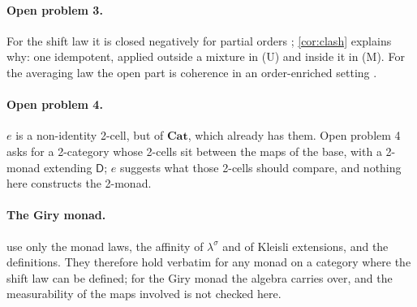 \documentclass[11pt]{article}
\theoremstyle{definition}
\newcommand{\D}{\mathsf D}
\newcommand{\ls}{\lambda^{\sigma}}
\begin{document}
\paragraph{Open problem 3.} For the shift law it is closed negatively for partial orders \cite[Prop.~13.17]{Tower}; \cref{cor:clash}
explains why: one idempotent, applied outside a mixture in (U) and inside it in (M). For the averaging law the open part is coherence
in an order-enriched setting \cite[Thm.~13.16]{Tower}.
\paragraph{Open problem 4.} $e$ is a non-identity 2-cell, but of $\mathbf{Cat}$, which already has them. Open problem 4 asks for a 2-category
whose 2-cells sit between the maps of the base, with a 2-monad extending $\D$; $e$ suggests what those 2-cells should compare, and nothing
here constructs the 2-monad.
\paragraph{The Giry monad.}  use only the monad laws, the affinity of $\ls$ and of Kleisli extensions, and
the definitions. They therefore hold verbatim for any monad on a category where the shift law can be defined; for the Giry monad
\cite{Giry1982} the algebra carries over, and the measurability of the maps involved is not checked here.
\end{document}
